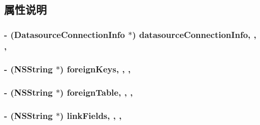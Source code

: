 \subsection{属性说明}
\hypertarget{interface_link_item_ac227b65db18a97406f2989367279d5b1}{
\subsubsection[{datasource\-Connection\-Info}]{\setlength{\rightskip}{0pt plus 5cm}-\/ ({\bf Datasource\-Connection\-Info} $\ast$) datasource\-Connection\-Info\hspace{0.3cm}{\ttfamily [read]}, {\ttfamily [write]}, {\ttfamily [atomic]}, {\ttfamily [retain]}}}\label{interface_link_item_ac227b65db18a97406f2989367279d5b1}
\hypertarget{interface_link_item_a033a104355e0dd425688c1ace667ee15}{
\subsubsection[{foreign\-Keys}]{\setlength{\rightskip}{0pt plus 5cm}-\/ (N\-S\-String $\ast$) foreign\-Keys\hspace{0.3cm}{\ttfamily [read]}, {\ttfamily [write]}, {\ttfamily [atomic]}, {\ttfamily [copy]}}}\label{interface_link_item_a033a104355e0dd425688c1ace667ee15}
\hypertarget{interface_link_item_a030e9399a97d2a165aa2ce69b798b115}{
\subsubsection[{foreign\-Table}]{\setlength{\rightskip}{0pt plus 5cm}-\/ (N\-S\-String $\ast$) foreign\-Table\hspace{0.3cm}{\ttfamily [read]}, {\ttfamily [write]}, {\ttfamily [atomic]}, {\ttfamily [copy]}}}\label{interface_link_item_a030e9399a97d2a165aa2ce69b798b115}
\hypertarget{interface_link_item_a480a48b69d6e2c01fa2bc35f584381f3}{
\subsubsection[{link\-Fields}]{\setlength{\rightskip}{0pt plus 5cm}-\/ (N\-S\-String $\ast$) link\-Fields\hspace{0.3cm}{\ttfamily [read]}, {\ttfamily [write]}, {\ttfamily [atomic]}, {\ttfamily [copy]}}}\label{interface_link_item_a480a48b69d6e2c01fa2bc35f584381f3}
